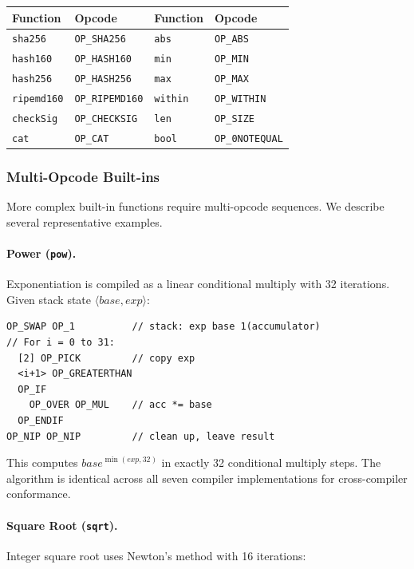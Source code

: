 \documentclass[11pt,a4paper]{article}
\newcommand{\op}[1]{\texttt{OP\_#1}}
\begin{document}
\begin{center}
\small
\begin{tabular}{@{}ll@{\qquad}ll@{}}
\toprule
\textbf{Function} & \textbf{Opcode} & \textbf{Function} & \textbf{Opcode} \\
\midrule
\texttt{sha256} & \op{SHA256} & \texttt{abs} & \op{ABS} \\
\texttt{hash160} & \op{HASH160} & \texttt{min} & \op{MIN} \\
\texttt{hash256} & \op{HASH256} & \texttt{max} & \op{MAX} \\
\texttt{ripemd160} & \op{RIPEMD160} & \texttt{within} & \op{WITHIN} \\
\texttt{checkSig} & \op{CHECKSIG} & \texttt{len} & \op{SIZE} \\
\texttt{cat} & \op{CAT} & \texttt{bool} & \op{0NOTEQUAL} \\
\bottomrule
\end{tabular}
\end{center}

\subsubsection{Multi-Opcode Built-ins}

More complex built-in functions require multi-opcode sequences.
We describe several representative examples.

\paragraph{Power (\texttt{pow}).}
Exponentiation is compiled as a linear conditional multiply with 32
iterations. Given stack state $\langle \textit{base}, \textit{exp} \rangle$:

\begin{lstlisting}[style=script]
OP_SWAP OP_1          // stack: exp base 1(accumulator)
// For i = 0 to 31:
  [2] OP_PICK         // copy exp
  <i+1> OP_GREATERTHAN
  OP_IF
    OP_OVER OP_MUL    // acc *= base
  OP_ENDIF
OP_NIP OP_NIP         // clean up, leave result
\end{lstlisting}

This computes $\textit{base}^{\min(\textit{exp}, 32)}$ in exactly 32
conditional multiply steps. The algorithm is identical across all seven
compiler implementations for cross-compiler conformance.

\paragraph{Square Root (\texttt{sqrt}).}
Integer square root uses Newton's method with 16 iterations:
\end{document}
